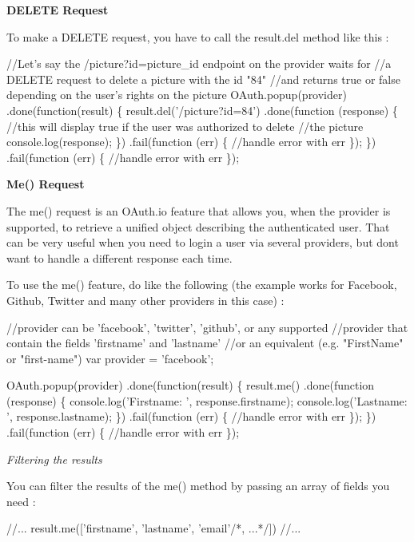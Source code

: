 {\bfseries D\+E\+L\+E\+TE Request}

To make a D\+E\+L\+E\+TE request, you have to call the {\ttfamily result.\+del} method like this \+:


\begin{DoxyCode}
//Let's say the /picture?id=picture\_id endpoint on the provider waits for
//a DELETE request to delete a picture with the id "84"
//and returns true or false depending on the user's rights on the picture
OAuth.popup(provider)
.done(function(result) \{
    result.del('/picture?id=84')
    .done(function (response) \{
        //this will display true if the user was authorized to delete
        //the picture
        console.log(response);
    \})
    .fail(function (err) \{
        //handle error with err
    \});
\})
.fail(function (err) \{
    //handle error with err
\});
\end{DoxyCode}


{\bfseries Me() Request}

The {\ttfamily me()} request is an O\+Auth.\+io feature that allows you, when the provider is supported, to retrieve a unified object describing the authenticated user. That can be very useful when you need to login a user via several providers, but don\textquotesingle{}t want to handle a different response each time.

To use the {\ttfamily me()} feature, do like the following (the example works for Facebook, Github, Twitter and many other providers in this case) \+:


\begin{DoxyCode}
//provider can be 'facebook', 'twitter', 'github', or any supported
//provider that contain the fields 'firstname' and 'lastname' 
//or an equivalent (e.g. "FirstName" or "first-name")
var provider = 'facebook';

OAuth.popup(provider)
.done(function(result) \{
    result.me()
    .done(function (response) \{
        console.log('Firstname: ', response.firstname);
        console.log('Lastname: ', response.lastname);
    \})
    .fail(function (err) \{
        //handle error with err
    \});
\})
.fail(function (err) \{
    //handle error with err
\});
\end{DoxyCode}


{\itshape Filtering the results}

You can filter the results of the {\ttfamily me()} method by passing an array of fields you need \+:


\begin{DoxyCode}
//...
result.me(['firstname', 'lastname', 'email'/*, ...*/])
//...
\end{DoxyCode}


